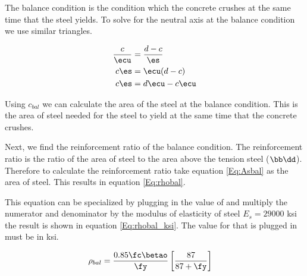 The balance condition is the condition which the concrete crushes at the same time that the steel yields. To solve for the neutral axis at the balance condition we use similar triangles.

\begin{align}
	\frac{c}{\ecu} &= \frac{d-c}{\es}\\ 
	c \es &= \ecu(d-c)\\ 
	c \es &= d\ecu -c\ecu
\end{align}


Using $c_{bal}$ we can calculate the area of the steel \As at the balance condition. This is the area of steel needed for the steel to yield at the same time that the concrete crushes.


Next, we find the reinforcement ratio of the balance condition. The reinforcement ratio is the ratio of the area of steel to the area above the tension steel ($\bb\dd$). Therefore to calculate the reinforcement ratio take equation \ref{Eq:Asbal} as the area of steel. This results in equation \ref{Eq:rhobal}.


This equation can be specialized by plugging in the value of \ecu and multiply the numerator and denominator by the modulus of elasticity of steel $E_s=29000$ ksi the result is shown in equation \ref{Eq:rhobal_ksi}. The value for \fy that is plugged in must be in ksi. 

\begin{align}
	\rho_{bal}
	&= 
	\frac{0.85\fc\betao}{\fy}
	\left[
		\frac{87}{87+\fy}
	\right]
	\label{Eq:rhobal_ksi}
\end{align}






